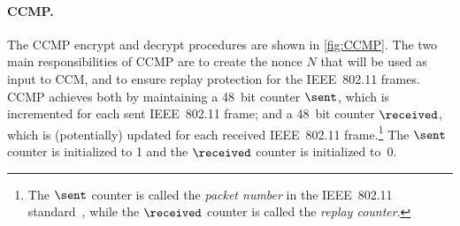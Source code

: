 \paragraph{CCMP.}
The CCMP encrypt and decrypt procedures are shown in \cref{fig:CCMP}.
The two main responsibilities of CCMP are to create the nonce $N$ that will be used as input to CCM,
and to ensure replay protection for the IEEE~802.11 frames.
CCMP achieves both by maintaining a 48~bit counter $\sent$,
which is incremented for each sent IEEE~802.11 frame;
and a 48~bit counter $\received$,
which is (potentially) updated for each received IEEE~802.11 frame.\footnote{The
$\sent$ counter is called the \emph{packet number} in the IEEE~802.11 standard~\cite{IEEE:2012:802.11},
while the $\received$ counter is called the \emph{replay counter}.
}
The $\sent$ counter is initialized to 1 and the $\received$ counter is initialized to~0.

